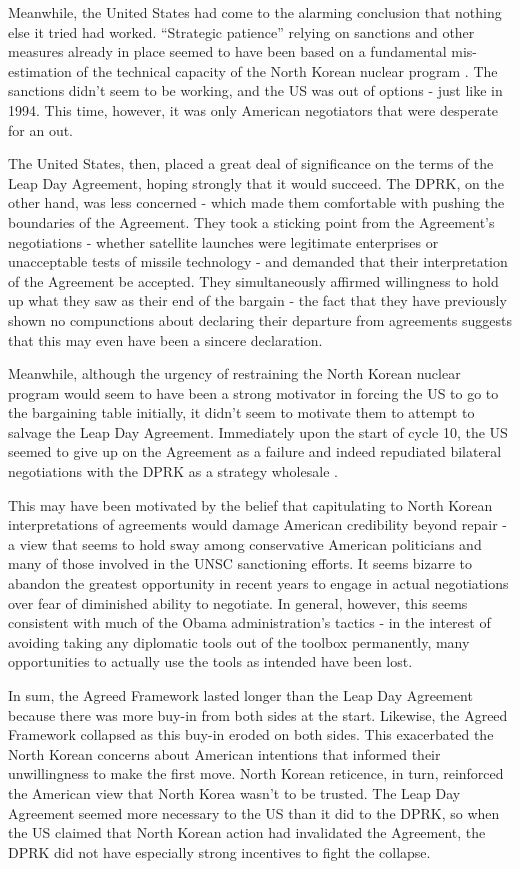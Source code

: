 Meanwhile, the United States had come to the alarming conclusion that nothing else it tried had worked. ``Strategic patience'' relying on sanctions and other measures already in place seemed to have been based on a fundamental mis-estimation of the technical capacity of the North Korean nuclear program \cite{snyder2}. The sanctions didn't seem to be working, and the US was out of options - just like in 1994. This time, however, it was only American negotiators that were desperate for an out.

The United States, then, placed a great deal of significance on the terms of the Leap Day Agreement, hoping strongly that it would succeed. The DPRK, on the other hand, was less concerned - which made them comfortable with pushing the boundaries of the Agreement. They took a sticking point from the Agreement's negotiations - whether satellite launches were legitimate enterprises or unacceptable tests of missile technology \cite{delury} - and demanded that their interpretation of the Agreement be accepted. They simultaneously affirmed willingness to hold up what they saw as their end of the bargain - the fact that they have previously shown no compunctions about declaring their departure from agreements suggests that this may even have been a sincere declaration.

Meanwhile, although the urgency of restraining the North Korean nuclear program would seem to have been a strong motivator in forcing the US to go to the bargaining table initially, it didn't seem to motivate them to attempt to salvage the Leap Day Agreement. Immediately upon the start of cycle 10, the US seemed to give up on the Agreement as a failure and indeed repudiated bilateral negotiations with the DPRK as a strategy wholesale \cite{delury}.

This may have been motivated by the belief that capitulating to North Korean interpretations of agreements would damage American credibility beyond repair - a view that seems to hold sway among conservative American politicians and many of those involved in the UNSC sanctioning efforts. It seems bizarre to abandon the greatest opportunity in recent years to engage in actual negotiations over fear of diminished ability to negotiate. In general, however, this seems consistent with much of the Obama administration's tactics - in the interest of avoiding taking any diplomatic tools out of the toolbox permanently, many opportunities to actually use the tools as intended have been lost.

In sum, the Agreed Framework lasted longer than the Leap Day Agreement because there was more buy-in from both sides at the start. Likewise, the Agreed Framework collapsed as this buy-in eroded on both sides. This exacerbated the North Korean concerns about American intentions that informed their unwillingness to make the first move. North Korean reticence, in turn, reinforced the American view that North Korea wasn't to be trusted. The Leap Day Agreement seemed more necessary to the US than it did to the DPRK, so when the US claimed that North Korean action had invalidated the Agreement, the DPRK did not have especially strong incentives to fight the collapse.

